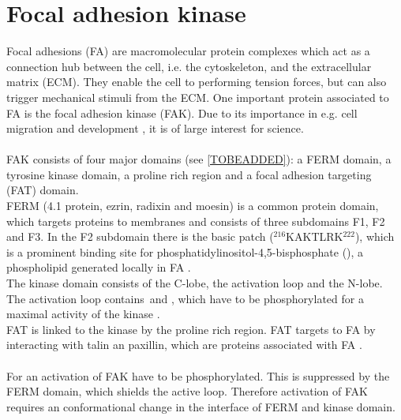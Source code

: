 \section{Focal adhesion kinase}
Focal adhesions (FA) are macromolecular protein complexes which act as a connection hub between the cell, i.e. the cytoskeleton, and the extracellular matrix (ECM). They enable the cell to performing tension forces, but can also trigger mechanical stimuli from the ECM. One important protein associated to FA is the focal adhesion kinase (FAK). Due to its importance in e.g. cell migration and development \autocite{pap004}, it is of large interest for science.\\%
\\
FAK consists of four major domains (see \autoref{TOBEADDED}): a FERM domain, a tyrosine kinase domain, a proline rich region and a focal adhesion targeting (FAT) domain.\\
FERM (4.1 protein, ezrin, radixin and moesin) is a common protein domain, which targets proteins to membranes \autocite{fermdomain} and consists of three subdomains F1, F2 and F3. In the F2 subdomain there is the basic patch  ($^{216}$KAKTLRK$^{222}$), which is a prominent binding site for phosphatidylinositol-4,5-bisphosphate (\pip), a phospholipid generated locally in FA \autocite{pap001}.\\
The kinase domain consists of the C-lobe, the activation loop and the N-lobe. The activation loop contains \,and , which have to be phosphorylated for a maximal activity of the kinase \autocite{tyrosinePhosphor}.\\
FAT is linked to the kinase by the proline rich region. FAT targets to FA by interacting with talin an paxillin, which are proteins associated with FA \autocite{fatdomain}.\\
\\
For an activation of FAK  have to be phosphorylated. This is suppressed by the FERM domain, which shields the active loop. Therefore activation of FAK requires an conformational change in the interface of FERM and kinase domain. %